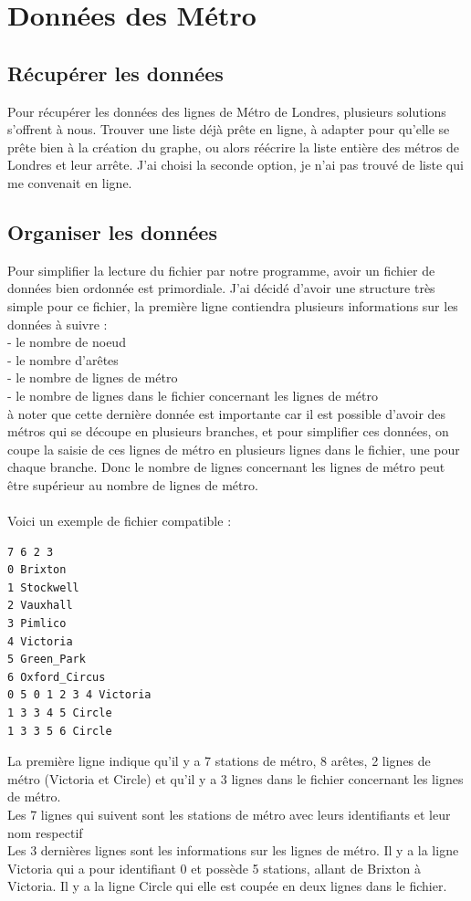 \documentclass[11pt]{article}
\begin{document}
	\section {Données des Métro}
	\subsection{Récupérer les données}
Pour récupérer les données des lignes de Métro de Londres, plusieurs solutions s'offrent à nous. Trouver une liste déjà prête en ligne, à adapter pour qu'elle se prête bien à la création du graphe, ou alors réécrire la liste entière des métros de Londres et leur arrête. J'ai choisi la seconde option, je n'ai pas trouvé de liste qui me convenait en ligne.
\subsection{Organiser les données}
Pour simplifier la lecture du fichier par notre programme, avoir un fichier de données bien ordonnée est primordiale. J'ai décidé d'avoir une structure très simple pour ce fichier, la première ligne contiendra plusieurs informations sur les données à suivre : \\- le nombre de noeud\\- le nombre d'arêtes\\- le nombre de lignes de métro\\- le nombre de lignes dans le fichier concernant les lignes de métro\\
à noter que cette dernière donnée est importante car il est possible d'avoir des métros qui se découpe en plusieurs branches, et pour simplifier ces données, on coupe la saisie de ces lignes de métro en plusieurs lignes dans le fichier, une pour chaque branche. Donc le nombre de lignes concernant les lignes de métro peut être supérieur au nombre de lignes de métro.\\ \\
Voici un exemple de fichier compatible :

		\begin{lstlisting}
7 6 2 3
0 Brixton
1 Stockwell
2 Vauxhall
3 Pimlico
4 Victoria
5 Green_Park
6 Oxford_Circus
0 5 0 1 2 3 4 Victoria
1 3 3 4 5 Circle
1 3 3 5 6 Circle

\end{lstlisting}

La première ligne indique qu'il y a 7 stations de métro, 8 arêtes, 2 lignes de métro (Victoria et Circle) et qu'il y a 3 lignes dans le fichier concernant les lignes de métro.\\
Les 7 lignes qui suivent sont les stations de métro avec leurs identifiants et leur nom respectif\\
Les 3 dernières lignes sont les informations sur les lignes de métro.
Il y a la ligne Victoria qui a pour identifiant 0 et possède 5 stations, allant de Brixton à Victoria.
Il y a la ligne Circle qui elle est coupée en deux lignes dans le fichier.
\end{document}
